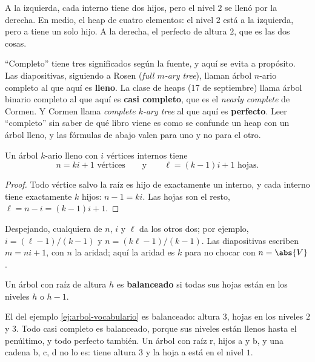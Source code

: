 \documentclass[11pt,letterpaper]{article}
\begin{document}
A la izquierda, cada interno tiene dos hijos, pero el nivel $2$ se
llenó por la derecha. En medio, el heap de cuatro elementos: el
nivel $2$ está a la izquierda, pero a tiene un solo hijo. A la
derecha, el perfecto de altura $2$, que es las dos cosas.

\begin{ojo}
  ``Completo'' tiene tres significados según la fuente, y aquí se
  evita a propósito. Las diapositivas, siguiendo a Rosen
  (\textit{full $m$-ary tree}), llaman árbol $n$-ario completo al que
  aquí es \textbf{lleno}. La clase de heaps (17 de septiembre) llama
  árbol binario completo al que aquí es \textbf{casi completo}, que
  es el \textit{nearly complete} de Cormen. Y Cormen llama
  \textit{complete $k$-ary tree} al que aquí es \textbf{perfecto}.
  Leer ``completo'' sin saber de qué libro viene es como se confunde
  un heap con un árbol lleno, y las fórmulas de abajo valen para uno
  y no para el otro.
\end{ojo}

\begin{teorema}
  \label{teo:arbol-conteo}
  Un árbol $k$-ario lleno con $i$ vértices internos tiene
  \[
    n = ki + 1 \text{ vértices} \qquad \text{y} \qquad
    \ell = (k - 1)i + 1 \text{ hojas.}
  \]
\end{teorema}

\begin{proof}
  Todo vértice salvo la raíz es hijo de exactamente un interno, y cada
  interno tiene exactamente $k$ hijos: $n - 1 = ki$. Las hojas son el
  resto, $\ell = n - i = (k - 1)i + 1$.
\end{proof}

Despejando, cualquiera de $n$, $i$ y $\ell$ da los otros dos; por
ejemplo, $i = (\ell - 1)/(k - 1)$ y $n = (k\ell - 1)/(k - 1)$. Las
diapositivas escriben $m = ni + 1$, con $n$ la aridad; aquí la aridad
es $k$ para no chocar con $n = \abs{V}$.

\begin{definicion}
  Un árbol con raíz de altura $h$ es \textbf{balanceado} si todas sus
  hojas están en los niveles $h$ o $h - 1$.
\end{definicion}

El del ejemplo \ref{ej:arbol-vocabulario} es balanceado: altura $3$,
hojas en los niveles $2$ y $3$. Todo casi completo es balanceado,
porque sus niveles están llenos hasta el penúltimo, y todo perfecto
también. Un árbol con raíz r, hijos a y b, y una cadena b, c, d no lo
es: tiene altura $3$ y la hoja a está en el nivel $1$.
\end{document}
